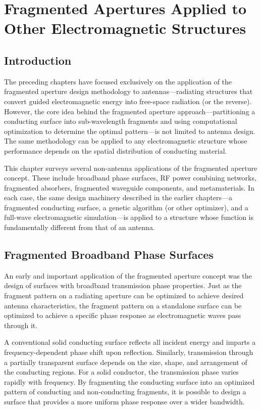 \chapter{Fragmented Apertures Applied to Other Electromagnetic Structures}

\section{Introduction}

The preceding chapters have focused exclusively on the application of the fragmented aperture design methodology to antennas---radiating structures that convert guided electromagnetic energy into free-space radiation (or the reverse).  However, the core idea behind the fragmented aperture approach---partitioning a conducting surface into sub-wavelength fragments and using computational optimization to determine the optimal pattern---is not limited to antenna design.  The same methodology can be applied to any electromagnetic structure whose performance depends on the spatial distribution of conducting material.

This chapter surveys several non-antenna applications of the fragmented aperture concept.  These include broadband phase surfaces, RF power combining networks, fragmented absorbers, fragmented waveguide components, and metamaterials.  In each case, the same design machinery described in the earlier chapters---a fragmented conducting surface, a genetic algorithm (or other optimizer), and a full-wave electromagnetic simulation---is applied to a structure whose function is fundamentally different from that of an antenna.

\section{Fragmented Broadband Phase Surfaces}
\label{sec:phaseSurface}

An early and important application of the fragmented aperture concept was the design of surfaces with broadband transmission phase properties.  Just as the fragment pattern on a radiating aperture can be optimized to achieve desired antenna characteristics, the fragment pattern on a standalone surface can be optimized to achieve a specific phase response as electromagnetic waves pass through it.

A conventional solid conducting surface reflects all incident energy and imparts a frequency-dependent phase shift upon reflection.  Similarly, transmission through a partially transparent surface depends on the size, shape, and arrangement of the conducting regions.  For a solid conductor, the transmission phase varies rapidly with frequency.  By fragmenting the conducting surface into an optimized pattern of conducting and non-conducting fragments, it is possible to design a surface that provides a more uniform phase response over a wider bandwidth.

